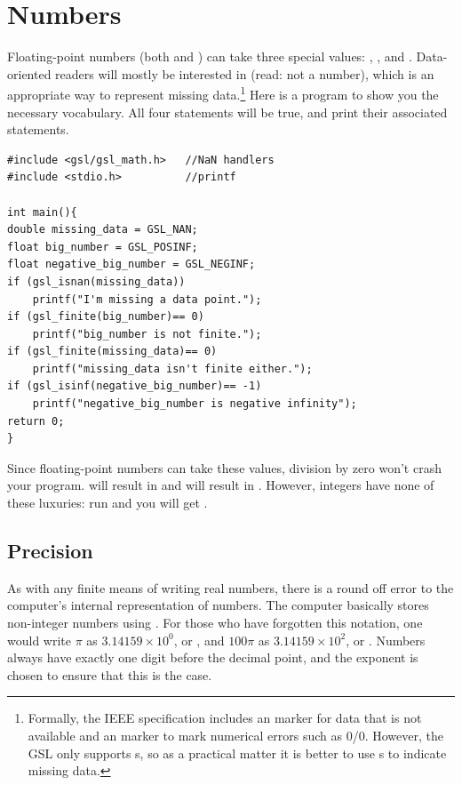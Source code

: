 
\section{\treesymbol Numbers}       \label{numbers}
Floating-point numbers (both  and ) can take three special values: , , and . Data-oriented readers will mostly be
interested in  (read: not a number), which is an appropriate way to represent missing data.\footnote{Formally, the IEEE specification includes an  marker for data that is not available and an  marker to mark numerical errors such as 0/0. However, the GSL only supports s, so as a practical matter it is better to use s to indicate missing data.} Here is a
program to show you the necessary vocabulary. All four  statements will be true, and print their associated
statements.
\begin{lstlisting}
#include <gsl/gsl_math.h>   //NaN handlers
#include <stdio.h>          //printf

int main(){
double missing_data = GSL_NAN;
float big_number = GSL_POSINF;
float negative_big_number = GSL_NEGINF;
if (gsl_isnan(missing_data))
    printf("I'm missing a data point.");
if (gsl_finite(big_number)== 0)
    printf("big_number is not finite.");
if (gsl_finite(missing_data)== 0)
    printf("missing_data isn't finite either.");
if (gsl_isinf(negative_big_number)== -1)
    printf("negative_big_number is negative infinity");
return 0;
}
\end{lstlisting}

Since floating-point numbers can take these values, division by zero
won't crash your program.  will result in
 and  will result in . However, integers have none of these luxuries: run  and you will get .

\subsection{Precision} 
As with any finite means of writing real numbers,
there is a round off error to the computer's internal representation of
numbers. The computer basically stores non-integer numbers using
. For those who have forgotten this notation, one
would write  $\pi$ as $3.14159 \times 10^0$, or , 
and $100\pi$ as $3.14159 \times 10^2$, or . 
Numbers always have exactly one digit before the decimal point, and the
exponent is chosen to ensure that this is the case.

